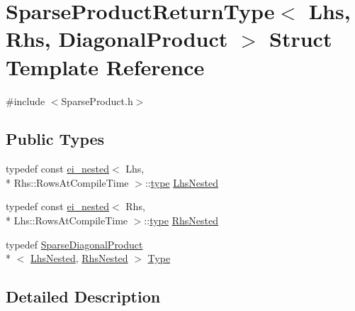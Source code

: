 \hypertarget{struct_sparse_product_return_type_3_01_lhs_00_01_rhs_00_01_diagonal_product_01_4}{\section{Sparse\-Product\-Return\-Type$<$ Lhs, Rhs, Diagonal\-Product $>$ Struct Template Reference}
\label{struct_sparse_product_return_type_3_01_lhs_00_01_rhs_00_01_diagonal_product_01_4}
}


{\ttfamily \#include $<$Sparse\-Product.\-h$>$}

\subsection*{Public Types}
\begin{DoxyCompactItemize}
\item 
typedef const \hyperlink{structei__nested}{ei\-\_\-nested}$<$ Lhs, \\*
Rhs\-::\-Rows\-At\-Compile\-Time $>$\-::\hyperlink{glext_8h_a7d05960f4f1c1b11f3177dc963a45d86}{type} \hyperlink{struct_sparse_product_return_type_3_01_lhs_00_01_rhs_00_01_diagonal_product_01_4_ad643a2d49fbe26a350fc93993fae67e3}{Lhs\-Nested}
\item 
typedef const \hyperlink{structei__nested}{ei\-\_\-nested}$<$ Rhs, \\*
Lhs\-::\-Rows\-At\-Compile\-Time $>$\-::\hyperlink{glext_8h_a7d05960f4f1c1b11f3177dc963a45d86}{type} \hyperlink{struct_sparse_product_return_type_3_01_lhs_00_01_rhs_00_01_diagonal_product_01_4_a7c01138004234bb975371f32dae31e20}{Rhs\-Nested}
\item 
typedef \hyperlink{class_sparse_diagonal_product}{Sparse\-Diagonal\-Product}\\*
$<$ \hyperlink{struct_sparse_product_return_type_3_01_lhs_00_01_rhs_00_01_diagonal_product_01_4_ad643a2d49fbe26a350fc93993fae67e3}{Lhs\-Nested}, \hyperlink{struct_sparse_product_return_type_3_01_lhs_00_01_rhs_00_01_diagonal_product_01_4_a7c01138004234bb975371f32dae31e20}{Rhs\-Nested} $>$ \hyperlink{struct_sparse_product_return_type_3_01_lhs_00_01_rhs_00_01_diagonal_product_01_4_a656be86738827b9e30b7de5faeb93c79}{Type}
\end{DoxyCompactItemize}


\subsection{Detailed Description}
